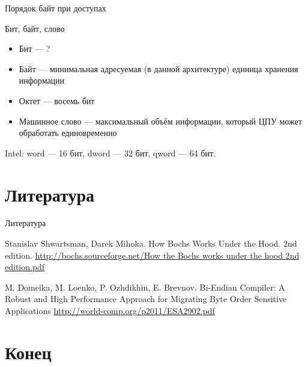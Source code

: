 \documentclass{beamer}
\newcommand{\abbr}{\textit{англ.}\ }
\begin{document}
\begin{frame}{Порядок байт при доступах}



\end{frame}

\begin{frame}{Бит, байт, слово}
\begin{itemize}
\item Бит — ?\pause
\item Байт \pause — минимальная адресуемая (в данной архитектуре) единица хранения
информации \pause
\item Октет \pause — восемь бит \pause
\item Машинное слово \pause — максимальный объём информации, который ЦПУ может обработать единовременно
\end{itemize}

\pause
Intel: word — 16 бит, dword — 32 бит, qword — 64 бит.
\end{frame}



\section*{Литература}

\begin{frame}[allowframebreaks]{Литература}
\begin{thebibliography}{99}
     Stanislav Shwartsman, Darek Mihoka. How Bochs Works Under the Hood. 2nd edition.
    \url{http://bochs.sourceforge.net/How the Bochs works under the hood 2nd edition.pdf}
    
     M. Domeika, M. Loenko, P. Ozhdikhin, E. Brevnov.  Bi-Endian Compiler: A Robust and High Performance Approach for Migrating Byte Order Sensitive Applications 
    \url{http://world-comp.org/p2011/ESA2902.pdf}
    
\end{thebibliography}
\end{frame}

\section*{Конец}
\end{document}
